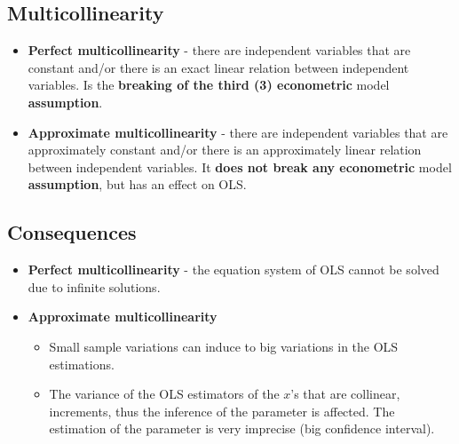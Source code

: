 \documentclass[10pt, a4paper, landscape]{extarticle}
\begin{document}
\begin{multicols}{3}
\section*{Multicollinearity}
	\begin{itemize}[leftmargin=*]
		\item \textbf{Perfect multicollinearity} - there are independent variables that are constant and/or there is an exact linear relation between independent variables. Is the \textbf{breaking of the third (3) econometric} model \textbf{assumption}.
		\item \textbf{Approximate multicollinearity} - there are independent variables that are approximately constant and/or there is an approximately linear relation between independent variables. It \textbf{does not break any econometric} model \textbf{assumption}, but has an effect on OLS.
	\end{itemize}
	\subsection*{Consequences}
		\begin{itemize}[leftmargin=*]
			\item \textbf{Perfect multicollinearity} - the equation system of OLS cannot be solved due to infinite solutions.
			\item \textbf{Approximate multicollinearity}
			\begin{itemize}[leftmargin=*]
				\item Small sample variations can induce to big variations in the OLS estimations.
				\item The variance of the OLS estimators of the $x$'s that are collinear, increments, thus the inference of the parameter is affected. The estimation of the parameter is very imprecise (big confidence interval).
			\end{itemize}
		\end{itemize}

\end{multicols}
\end{document}
